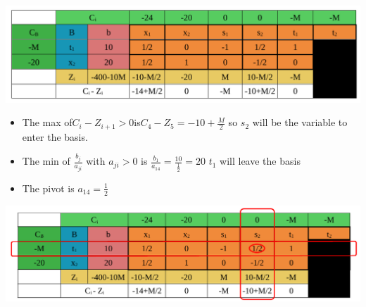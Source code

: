 \vspace{0.25cm}



\begin{center}
    \includegraphics{Chapters/Simplexe/EX/EX3/ex3.3.pdf}
\end{center}

\vspace{0.25cm}
\begin{itemize}   
    \item The max of\hspace{0.2cm}\(C_i - Z_{i+1} > 0\)\hspace{0.2cm}is\hspace{0.2cm}\(C_4 - Z_5 = -10+\frac{M}{2}\)\hspace{0.1cm} so \(s_2\) 
will be the variable to enter the basis.
\item The min of \hspace{0.1cm}\(\frac{b_j}{a_{ji}}\)\hspace{0.1cm} with \(a_{ji} > 0\)\hspace{0.1cm} is \hspace{0.1cm} \(\frac{b_1}{a_{14}} = \frac{10}{\frac{1}{2}} = 20\)\hspace{0.35cm} \(t_1\)
will leave the basis
\item The pivot is \(a_{14} = \frac{1}{2}\)
 
\end{itemize}


\vspace{0.25cm}


\begin{center}
    \includegraphics{Chapters/Simplexe/EX/EX3/ex3.4.pdf}
\end{center}

